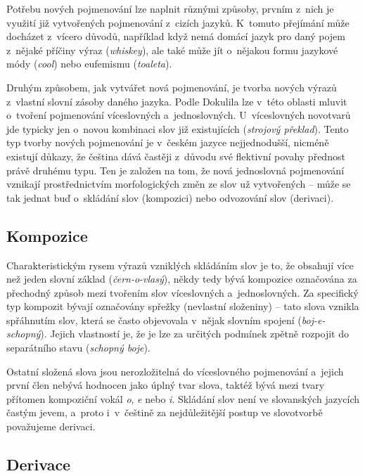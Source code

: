 Potřebu nových pojmenování lze naplnit různými způsoby, prvním z~nich je
využití již vytvořených pojmenování z~cizích jazyků. K~tomuto přejímání
může docházet z~vícero důvodů, například když nemá domácí jazyk pro daný
pojem z~nějaké příčiny výraz (\emph{whiskey}), ale také může jít
o~nějakou formu jazykové módy (\emph{cool}) nebo eufemismu
(\emph{toaleta}).~\parencite[19]{dokulil62}

Druhým způsobem, jak vytvářet nová pojmenování, je tvorba nových výrazů
z~vlastní slovní zásoby daného jazyka. Podle Dokulila lze v~této oblasti
mluvit o~tvoření pojmenování víceslovných a~jednoslovných.
U~víceslovných novotvarů jde typicky jen o~novou kombinaci slov již
existujících (\emph{strojový překlad}). Tento typ tvorby nových
pojmenování je v~českém jazyce nejjednodušší, nicméně existují důkazy,
že čeština dává častěji z~důvodu své flektivní povahy přednost právě
druhému typu. Ten je založen na tom, že nová jednoslovná pojmenování
vznikají prostřednictvím morfologických změn ze slov už vytvořených --
může se tak jednat buď o~skládání slov (kompozici) nebo odvozování slov
(derivaci).~\parencite[21]{dokulil62}

\hypertarget{kompozice}{%
\subsection{Kompozice}\label{kompozice}}

Charakteristickým rysem výrazů vzniklých skládáním slov je to, že
obsahují více než jeden slovní základ (\emph{čern-o-vlasý}), někdy tedy
bývá kompozice označována za přechodný způsob mezi tvořením slov
víceslovných a~jednoslovných. Za specifický typ kompozit bývají
označovány spřežky (nevlastní složeniny) -- tato slova vznikla
spřáhnutím slov, která se často objevovala v~nějak slovním spojení
(\emph{boj-e-schopný}). Jejich vlastností je, že je lze za určitých
podmínek zpětně rozpojit do separátního stavu (\emph{schopný boje}).
\parencite[22]{dokulil62}

Ostatní složená slova jsou nerozložitelná do víceslovného pojmenování
a~jejich první člen nebývá hodnocen jako úplný tvar slova, taktéž bývá
mezi tvary přítomen kompoziční vokál \emph{o}, \emph{e} nebo \emph{i}.
Skládání slov není ve slovanských jazycích častým jevem, a~proto
i~v~češtině za nejdůležitější postup ve slovotvorbě považujeme derivaci.
\parencite[22]{dokulil62}

\hypertarget{derivace}{%
\subsection{Derivace}\label{derivace}}

